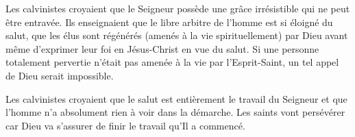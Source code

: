 
Les calvinistes croyaient que le Seigneur possède une grâce irrésistible
 qui ne peut être entravée. Ils enseignaient que le libre arbitre de l'hom\-me
 est si éloigné du salut, que les élus sont régénérés (amenés à la vie spirituellement)
 par Dieu avant
 même d'exprimer leur foi en Jésus-Christ en vue du salut.
 Si une per\-son\-ne totalement pervertie n'était pas amenée à la vie par l'Esprit-Saint,
 un tel appel de Dieu serait impossible.


Les calvinistes croyaient que le
 salut est entièrement le travail du Seigneur
 et que l'homme n'a absolument rien à voir dans la démarche.
 Les saints vont persévérer car Dieu va s'as\-surer de finir le travail
 qu'Il a commencé.



